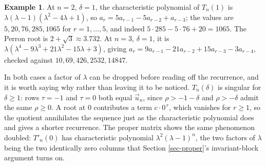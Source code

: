\documentclass[11pt, a4paper, abstract=yes]{scrartcl}
\theoremstyle{definition}
\newtheorem{mexample}[definition]{Example}
\theoremstyle{remark}
\theoremstyle{plain}
\begin{document}
\begin{mexample}
At \(n=2\), \(\delta=1\), the characteristic polynomial of \(T_n(1)\) is
\(\lambda(\lambda-1)(\lambda^2-4\lambda+1)\), so \(a_r=5a_{r-1}-5a_{r-2}+a_{r-3}\); the values are
\(5,20,76,285,1065\) for \(r=1,\dots,5\), and indeed \(5\cdot285-5\cdot76+20=1065\). The Perron root
is \(2+\sqrt3\approx3.732\). At \(n=3\), \(\delta=1\), it is
\(\lambda(\lambda^4-9\lambda^3+21\lambda^2-15\lambda+3)\), giving
\(a_r=9a_{r-1}-21a_{r-2}+15a_{r-3}-3a_{r-4}\), checked against \(10,69,426,2532,14847\).

In both cases a factor of \(\lambda\) can be dropped before reading off the recurrence, and it is
worth saying why rather than leaving it to be noticed. \(T_n(\delta)\) is singular for
\(\delta\ge1\): rows \(\tau=-1\) and \(\tau=0\) both equal \(\vec u_n\), since
\(\rho>-1-\delta\) and \(\rho>-\delta\) admit the same \(\rho\ge0\). A root at \(0\)
contributes a term \(c\cdot0^{\,r}\), which vanishes for \(r\ge1\), so the quotient annihilates
the sequence just as the characteristic polynomial does and gives a shorter recurrence. The proper
matrix shows the same phenomenon doubled: \(T'_n(0)\) has characteristic polynomial
\(\lambda^2(\lambda-1)^n\), the two factors of \(\lambda\) being the two identically zero
columns that Section \ref{sec-proper}'s invariant-block argument turns on.


\end{mexample}
\end{document}
